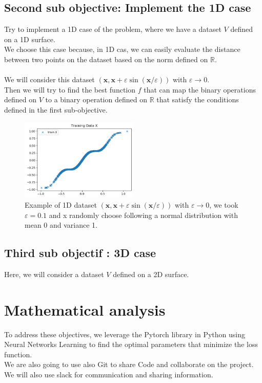 \documentclass{report}
\begin{document}
        \subsection*{Second sub objective: Implement the 1D case}
            Try to implement a 1D case of the problem, where we have a dataset $V$ defined on a 1D surface.
            \\ 
            We choose this case because, in 1D cas, we can easily evaluate the distance between two points on the dataset based on the norm defined on $\mathbb{R}$.
            \\
            \\
            We will consider this dataset 
            $(\mathbf{x}, \mathbf{x}+\varepsilon \sin (\mathbf{x} / \varepsilon))$ with $\varepsilon \rightarrow 0$.
            \\
            Then we will try to find the best function $f$ that can map the binary operations defined on $V$ to a binary operation defined on $\mathbb{R}$ that satisfy the conditions defined in the first sub-objective.
            \newpage
            \begin{figure}
                \centering
                \includegraphics[width=0.5\textwidth]{./images/M.png}
                \caption{Example of 1D dataset  $(\mathbf{x}, \mathbf{x}+\varepsilon \sin (\mathbf{x} / \varepsilon))$ with $\varepsilon \rightarrow 0$, we took $\varepsilon = 0.1$ and x randomly choose following a normal distribution with mean 0 and variance 1.} 
            \end{figure}

        \subsection*{Third sub objectif : 3D case}
            Here, we will consider a dataset $V$ defined on a 2D surface.

        
\section{Mathematical analysis}
    To address these objectives, we leverage
    the Pytorch library in Python using Neural Networks Learning to find the optimal parameters that minimize the loss function.\\
    We are also going to use also Git to share Code and collaborate on the project.\\ 
    We will also use slack for communication and sharing information.\\
\end{document}
